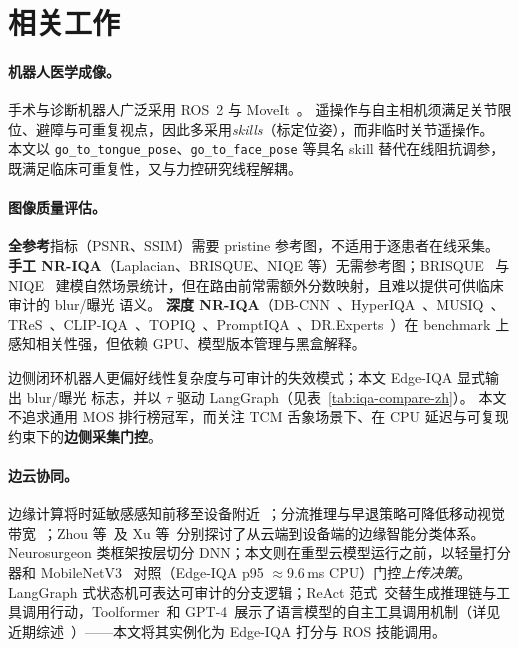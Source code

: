 \section{相关工作}
\label{sec:related-zh}

\paragraph{机器人医学成像。}
手术与诊断机器人广泛采用 ROS~2 与 MoveIt~\cite{moore2021ros2,chitta2009moveit}。
遥操作与自主相机须满足关节限位、避障与可重复视点，因此多采用\emph{skills}（标定位姿），而非临时关节遥操作。
本文以 \texttt{go\_to\_tongue\_pose}、\texttt{go\_to\_face\_pose} 等具名 skill 替代在线阻抗调参，既满足临床可重复性，又与力控研究线程解耦。

\paragraph{图像质量评估。}
\textbf{全参考}指标（PSNR、SSIM）需要 pristine 参考图，不适用于逐患者在线采集。
\textbf{手工 NR-IQA}（Laplacian、BRISQUE、NIQE 等）无需参考图；BRISQUE~\cite{mittal2012brisque} 与 NIQE~\cite{mittal2012niqe} 建模自然场景统计，但在路由前常需额外分数映射，且难以提供可供临床审计的 blur/曝光 语义。
\textbf{深度 NR-IQA}（DB-CNN~\cite{zhang2018blind}、HyperIQA~\cite{su2020hyperiqa}、MUSIQ~\cite{ke2021musiq}、TReS~\cite{golestaneh2022tres}、CLIP-IQA~\cite{wang2023clipiqa}、TOPIQ~\cite{chen2024topiq}、PromptIQA~\cite{chen2024promptiqa}、DR.Experts~\cite{fu2026dr.experts}）在 benchmark 上感知相关性强，但依赖 GPU、模型版本管理与黑盒解释。

边侧闭环机器人更偏好线性复杂度与可审计的失效模式；本文 Edge-IQA 显式输出 blur/曝光 标志，并以 $\tau$ 驱动 LangGraph（见表~\ref{tab:iqa-compare-zh}）。
本文不追求通用 MOS 排行榜冠军，而关注 TCM 舌象场景下、在 CPU 延迟与可复现约束下的\textbf{边侧采集门控}。

\paragraph{边云协同。}
边缘计算将时延敏感感知前移至设备附近~\cite{wang2014edge}；分流推理与早退策略可降低移动视觉带宽~\cite{kang2017neurosurgeon,li2018edge}；Zhou 等~\cite{zhou2019edge}及 Xu 等~\cite{xu2021a}分别探讨了从云端到设备端的边缘智能分类体系。
Neurosurgeon 类框架按层切分 DNN；本文则在重型云模型运行之前，以轻量打分器和 MobileNetV3~\cite{howard2019mobilenetv3} 对照（Edge-IQA p95 $\approx$9.6\,ms CPU）门控\emph{上传决策}。
LangGraph 式状态机可表达可审计的分支逻辑；ReAct 范式~\cite{yao2023react}交替生成推理链与工具调用行动，Toolformer~\cite{schick2023toolformer}和 GPT-4~\cite{openai2023gpt-4}展示了语言模型的自主工具调用机制（详见近期综述~\cite{wang2024a}）——本文将其实例化为 Edge-IQA 打分与 ROS 技能调用。

